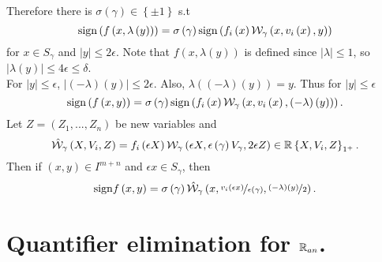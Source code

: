 Therefore there is $\sigma\left(\gamma\right)\in\left\{ \pm1\right\} $
s.t
\[
\mathrm{sign}\left(f\left(x,\lambda\left(y\right)\right)\right)=\sigma\left(\gamma\right)\mathrm{sign}\left(f_{i}\left(x\right)\mathcal{W}_{\gamma}\left(x,v_{i}\left(x\right),y\right)\right)
\]
for $x\in S_{\gamma}$ and $\left|y\right|\leq2\epsilon$. Note that
$f\left(x,\lambda\left(y\right)\right)$ is defined since $\left|\lambda\right|\leq1$,
so $\left|\lambda\left(y\right)\right|\leq4\epsilon\leq\delta$.\\
For $\left|y\right|\leq\epsilon$, $\left|\left(-\lambda\right)\left(y\right)\right|\leq2\epsilon$.
Also, $\lambda\left(\left(-\lambda\right)\left(y\right)\right)=y$.
Thus for $\left|y\right|\leq\epsilon$
\[
\mathrm{sign}\left(f\left(x,y\right)\right)=\sigma\left(\gamma\right)\mathrm{sign}\left(f_{i}\left(x\right)\mathcal{W}_{\gamma}\left(x,v_{i}\left(x\right),\left(-\lambda\right)\left(y\right)\right)\right).
\]
Let $Z=\left(Z_{1},...,Z_{n}\right)$ be new variables and 
\[
\hat{\mathcal{W}}_{\gamma}\left(X,V_{i},Z\right)=f_{i}\left(\epsilon X\right)\mathcal{W}_{\gamma}\left(\epsilon X,\epsilon\left(\gamma\right)V_{\gamma},2\epsilon Z\right)\in\mathbb{R}\left\{ X,V_{i},Z\right\} _{1^{+}}.
\]
Then if $\left(x,y\right)\in I^{m+n}$ and $\epsilon x\in S_{\gamma}$,
then 
\[
\mathrm{sign}f\left(x,y\right)=\sigma\left(\gamma\right)\hat{\mathcal{W}}_{\gamma}\left(x,\nicefrac{v_{i}\left(\epsilon x\right)}{\epsilon\left(\gamma\right)},\nicefrac{\left(-\lambda\right)\left(y\right)}{2}\right).
\]



\section{Quantifier elimination for $\mathbb{R}_{an}$.}

